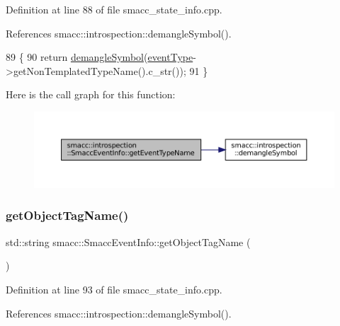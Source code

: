 Definition at line 88 of file smacc\+\_\+state\+\_\+info.\+cpp.



References smacc\+::introspection\+::demangle\+Symbol().


\begin{DoxyCode}
89 \{
90     \textcolor{keywordflow}{return} \hyperlink{namespacesmacc_1_1introspection_a2f495108db3e57604d8d3ff5ef030302}{demangleSymbol}(\hyperlink{structsmacc_1_1introspection_1_1SmaccEventInfo_af3bdf1abf797864e681662d92a5515f9}{eventType}->getNonTemplatedTypeName().c\_str());
91 \}
\end{DoxyCode}
Here is the call graph for this function\+:
\nopagebreak
\begin{figure}[H]
\begin{center}
\leavevmode
\includegraphics[width=350pt]{structsmacc_1_1introspection_1_1SmaccEventInfo_ae0ed6a9506dbe526269a0bd956a71044_cgraph}
\end{center}
\end{figure}
\mbox{\label{structsmacc_1_1introspection_1_1SmaccEventInfo_a0aa5d15822e7642079f375ee0f4ff096}} 
\subsubsection{\texorpdfstring{get\+Object\+Tag\+Name()}{getObjectTagName()}}
{\footnotesize\ttfamily std\+::string smacc\+::\+Smacc\+Event\+Info\+::get\+Object\+Tag\+Name (\begin{DoxyParamCaption}{ }\end{DoxyParamCaption})}



Definition at line 93 of file smacc\+\_\+state\+\_\+info.\+cpp.



References smacc\+::introspection\+::demangle\+Symbol().



